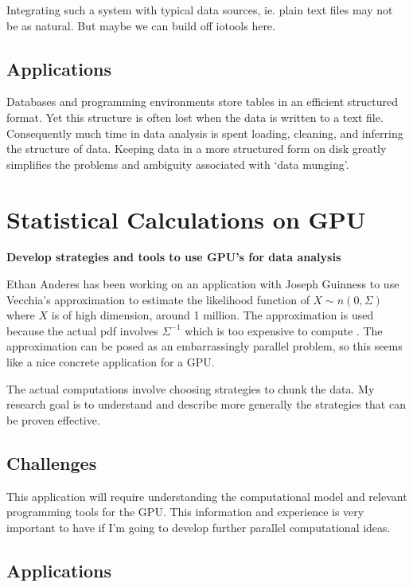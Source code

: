 \documentclass[12pt]{article}
\begin{document}
Integrating such a system with typical data sources, ie. plain text files may
not be as natural. But maybe we can build off iotools here.

\subsection{Applications}

Databases and programming environments store tables in an efficient
structured format. Yet this structure is often lost when the data is
written to a text file. Consequently much time in data analysis is
spent loading, cleaning, and inferring the structure of data. Keeping data
in a more structured form on disk greatly simplifies the problems and
ambiguity associated with `data munging'.


\section{Statistical Calculations on GPU}

\textbf{Develop strategies and tools to use GPU's for data analysis}

Ethan Anderes has been working on an application with Joseph Guinness to
use Vecchia's approximation to estimate the likelihood function of $X \sim
n(0, \Sigma)$ where $X$ is of high dimension, around 1 million. The
approximation is used because the actual pdf involves $\Sigma^{-1}$ which
is too expensive to compute \cite{guinness2016permutation}.  The
approximation can be posed as an embarrassingly parallel problem, so this
seems like a nice concrete application for a GPU.

The actual computations involve choosing strategies to chunk the data. 
My research goal is to understand and describe more generally the
strategies that can be proven effective.

\subsection{Challenges}

This application will require understanding the computational model and
relevant programming tools for the GPU. This information and experience is
very important to have if I'm going to develop further parallel
computational ideas.

\subsection{Applications}
\end{document}
